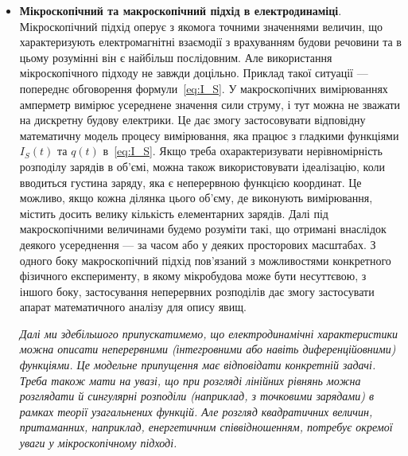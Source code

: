\begin{itemize}
\begin{figure}
		      \caption{}%
		      \label{tikz:current}
	      \end{figure}


    	\item \textbf{Мікроскопічний та макроскопічний підхід в електродинаміці}. Мікроскопічний підхід оперує з якомога точними значеннями величин, що характеризують електромагнітні взаємодії з врахуванням будови речовини та в цьому розумінні він є найбільш послідовним. Але використання мікроскопічного підходу не завжди доцільно. Приклад такої ситуації --- попереднє обговорення формули~\eqref{eq:I_S}. У макроскопічних вимірюваннях амперметр вимірює усереднене значення сили струму, і тут можна не зважати на дискретну будову електрики. Це дає змогу застосовувати відповідну математичну модель процесу вимірювання, яка працює з гладкими функціями $I_S(t)$ та $q(t)$ в~\eqref{eq:I_S}. Якщо треба охарактеризувати нерівномірність розподілу зарядів в об'ємі, можна також використовувати ідеалізацію, коли вводиться густина заряду, яка є неперервною функцією координат. Це можливо, якщо кожна ділянка цього об'єму, де виконують вимірювання, містить досить велику кількість елементарних зарядів. Далі під макроскопічними величинами будемо розуміти такі, що отримані внаслідок деякого усереднення --- за часом або у деяких просторових масштабах. З одного боку макроскопічний підхід пов'язаний з можливостями конкретного фізичного експерименту, в якому мікробудова може бути несуттєвою, з іншого боку, застосування неперервних розподілів дає змогу застосувати апарат математичного аналізу для опису явищ.

        \emph{Далі ми здебільшого припускатимемо, що електродинамічні характеристики можна описати неперервними (інтегровними або навіть диференційовними) функціями. Це модельне припущення має відповідати конкретній задачі. Треба також мати на увазі, що при розгляді лінійних рівнянь можна розглядати й сингулярні розподіли (наприклад, з точковими зарядами) в рамках теорії узагальнених функцій. Але розгляд квадратичних величин, притаманних, наприклад, енергетичним співвідношенням, потребує окремої уваги у мікроскопічному підході.}



\end{itemize}
